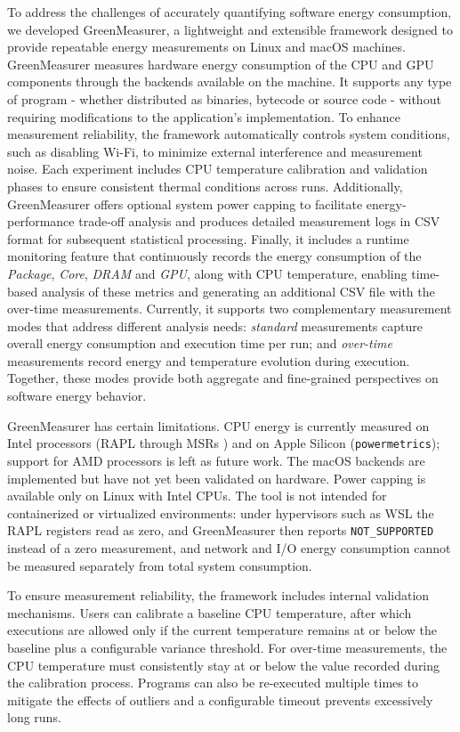 To address the challenges of accurately quantifying software energy consumption, we developed GreenMeasurer, a lightweight and extensible framework designed to provide repeatable energy measurements on Linux and macOS machines. GreenMeasurer measures hardware energy consumption of the CPU and GPU components through the backends available on the machine. It supports any type of program - whether distributed as binaries, bytecode or source code - without requiring modifications to the application's implementation. To enhance measurement reliability, the framework automatically controls system conditions, such as disabling Wi-Fi, to minimize external interference and measurement noise. Each experiment includes CPU temperature calibration and validation phases to ensure consistent thermal conditions across runs. Additionally, GreenMeasurer offers optional system power capping to facilitate energy-performance trade-off analysis and produces detailed measurement logs in CSV format for subsequent statistical processing. Finally, it includes a runtime monitoring feature that continuously records the energy consumption of the \textit{Package}, \textit{Core}, \textit{DRAM} and \textit{GPU}, along with CPU temperature, enabling time-based analysis of these metrics and generating an additional CSV file with the over-time measurements. Currently, it supports two complementary measurement modes that address different analysis needs: \textit{standard} measurements capture overall energy consumption and execution time per run; and \textit{over-time} measurements record energy and temperature evolution during execution. Together, these modes provide both aggregate and fine-grained perspectives on software energy behavior.

GreenMeasurer has certain limitations. CPU energy is currently measured on Intel processors (RAPL through MSRs \cite{msr4}) and on Apple Silicon (\texttt{powermetrics}); support for AMD processors is left as future work. The macOS backends are implemented but have not yet been validated on hardware. Power capping \cite{powercap2025} is available only on Linux with Intel CPUs. The tool is not intended for containerized or virtualized environments: under hypervisors such as WSL the RAPL registers read as zero, and GreenMeasurer then reports \texttt{NOT\_SUPPORTED} instead of a zero measurement, and network and I/O energy consumption cannot be measured separately from total system consumption.

To ensure measurement reliability, the framework includes internal validation mechanisms. Users can calibrate a baseline CPU temperature, after which executions are allowed only if the current temperature remains at or below the baseline plus a configurable variance threshold. For over-time measurements, the CPU temperature must consistently stay at or below the value recorded during the calibration process. Programs can also be re-executed multiple times to mitigate the effects of outliers \cite{castor2024estimatingenergyfootprintsoftware} and a configurable timeout prevents excessively long runs.


